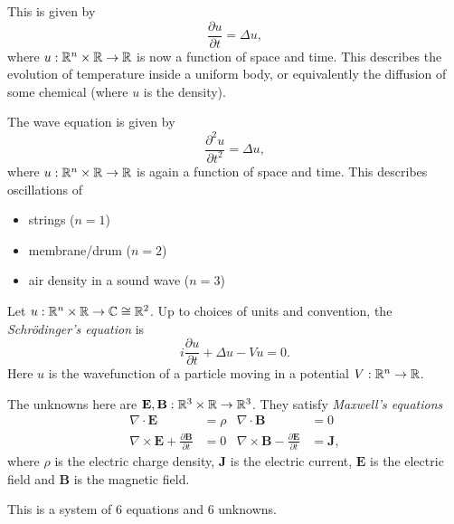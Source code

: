 \documentclass[a4paper]{article}
\begin{document}
\begin{eg}
  This is given by
  \[
    \frac{\partial u}{\partial t} = \Delta u,
  \]
  where $u: \mathbb{R}^n \times \mathbb{R} \to \mathbb{R}$ is now a function of space and time. This describes the evolution of temperature inside a uniform body, or equivalently the diffusion of some chemical (where $u$ is the density).
\end{eg}

\begin{eg}
  The wave equation is given by
  \[
    \frac{\partial^2 u}{\partial t^2} = \Delta u,
  \]
  where $u: \mathbb{R}^n \times \mathbb{R} \to \mathbb{R}$ is again a function of space and time. This describes oscillations of
  \begin{itemize}
    \item strings ($n = 1$)
    \item membrane/drum ($n = 2$)
    \item air density in a sound wave ($n = 3$)
  \end{itemize}
\end{eg}

\begin{eg}
  Let $u: \mathbb{R}^n \times \mathbb{R} \to \mathbb{C} \cong \mathbb{R}^2$. Up to choices of units and convention, the \emph{Schr\"odinger's equation} is
  \[
    i\frac{\partial u}{\partial t} + \Delta u - Vu = 0.
  \]
  Here $u$ is the wavefunction of a particle moving in a potential $V: \mathbb{R}^n \to \mathbb{R}$.
\end{eg}

\begin{eg}
  The unknowns here are $\mathbf{E}, \mathbf{B}: \mathbb{R}^3 \times \mathbb{R} \to \mathbb{R}^3$. They satisfy \emph{Maxwell's equations}
  \begin{align*}
    \nabla \cdot \mathbf{E} &= \rho & \nabla \cdot \mathbf{B} &= 0\\
    \nabla \times \mathbf{E} + \frac{\partial \mathbf{B}}{\partial t} &= 0 & \nabla \times \mathbf{B} - \frac{\partial \mathbf{E}}{\partial t} &= \mathbf{J},
  \end{align*}
  where $\rho$ is the electric charge density, $\mathbf{J}$ is the electric current, $\mathbf{E}$ is the electric field and $\mathbf{B}$ is the magnetic field.

  This is a system of 6 equations and 6 unknowns.
\end{eg}
\end{document}
